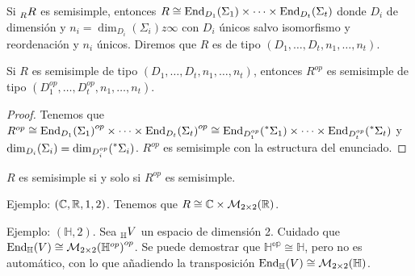 \begin{df}
  Si \(\prescript{}{R}{R}\) es semisimple, entonces
  \(R\cong\operatorname{End}_{D_1}(\Sigma_1)\times\cdots\times\operatorname{End}_{D_t}(\Sigma_t)\)
  donde \(D_i\) de dimensión y \(n_i=\dim_{D_i}(\Sigma_i)z\infty\) con
  \(D_i\) únicos salvo isomorfismo y reordenación y \(n_i\) únicos.
  Diremos que \(R\) es de tipo \((D_1,\ldots,D_t,n_1,\ldots,n_t)\).
\end{df}

\begin{teo}
  Si \({R}\) es semisimple de tipo
  \((D_1,\ldots,D_t,n_1,\ldots,n_t)\), entonces \(R^{op}\) es semisimple
  de tipo \((D_1^{op},\ldots,D_t^{op},n_1,\ldots,n_t)\).
\end{teo}
\begin{proof}
  Tenemos que \(R^{op}\cong{\operatorname{End}_{D_1}(\Sigma_1)}^{op}\times\cdots\times
{\operatorname{End}_{D_t}(\Sigma_t)}^{op}\cong
  {\operatorname{End}_{D_1^{op}}(\prescript{*}{}{\Sigma_1})}\times\cdots\times
  {\operatorname{End}_{D_t^{op}}(\prescript{*}{}{\Sigma_t})}\)
  y \(\dim_{D_i}(\Sigma_i)=\dim_{D_i^{op}}(\prescript{*}{}{\Sigma_i})\).
  \(R^{op}\) es semisimple con la estructura del enunciado.

\end{proof}


\begin{cor}
  \(R\) es semisimple si y solo si \(R^{op}\) es semisimple.
\end{cor}

Ejemplo: \((\mathbb{C},\mathbb{R},1,2)\). Tenemos que
\(R\cong\mathbb{C}\times\mathcal{M}_{2\times 2}(\mathbb{R})\).

Ejemplo: \((\mathbb{H},2)\). Sea \(\prescript{}{\mathbb{H}}{V}\) un
espacio de dimensión 2. Cuidado que \(\operatorname{End}_{\mathbb{H}}(V)\cong
{\mathcal{M}_{2\times 2}(\mathbb{H}^{op})}^{op}\). Se puede demostrar
que \(\mathbb{H^{op}}\cong\mathbb{H}\), pero no es automático, con lo que
añadiendo la transposición \(\operatorname{End}_{\mathbb{H}}(V)\cong
{\mathcal{M}_{2\times 2}(\mathbb{H})}\).

